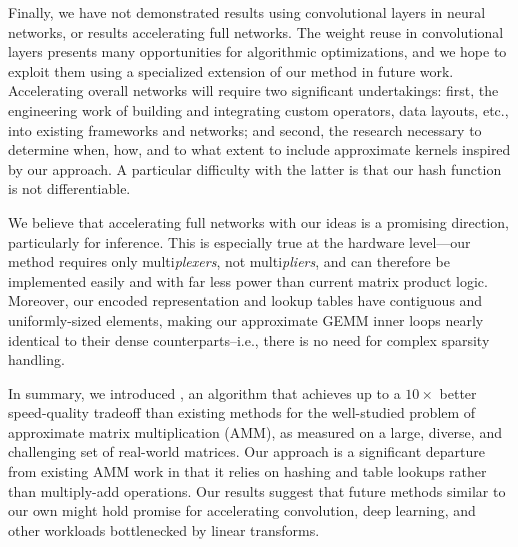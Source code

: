 Finally, we have not demonstrated results using convolutional layers in neural networks, or results accelerating full networks. The weight reuse in convolutional layers presents many opportunities for algorithmic optimizations, and we hope to exploit them using a specialized extension of our method in future work. Accelerating overall networks will require two significant undertakings: first, the engineering work of building and integrating custom operators, data layouts, etc., into existing frameworks and networks; and second, the research necessary to determine when, how, and to what extent to include approximate kernels inspired by our approach. A particular difficulty with the latter is that our hash function is not differentiable.

We believe that accelerating full networks with our ideas is a promising direction, particularly for inference. This is especially true at the hardware level---our method requires only multi\textit{plexers}, not multi\textit{pliers}, and can therefore be implemented easily and with far less power than current matrix product logic. Moreover, our encoded representation and lookup tables have contiguous and uniformly-sized elements, making our approximate GEMM inner loops nearly identical to their dense counterparts--i.e., there is no need for complex sparsity handling.

In summary, we introduced \ours, an algorithm that achieves up to a $10\times$ better speed-quality tradeoff than existing methods for the well-studied problem of approximate matrix multiplication (AMM), as measured on a large, diverse, and challenging set of real-world matrices. Our approach is a significant departure from existing AMM work in that it relies on hashing and table lookups rather than multiply-add operations. Our results suggest that future methods similar to our own might hold promise for accelerating convolution, deep learning, and other workloads bottlenecked by linear transforms.






